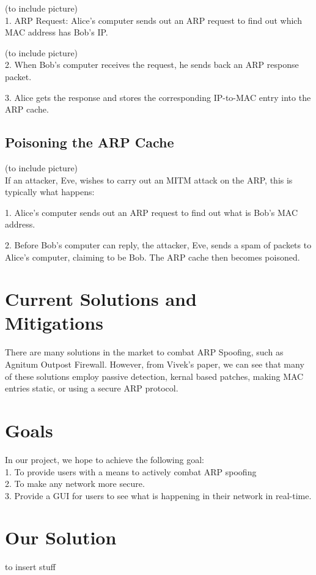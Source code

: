 \documentclass{acm_proc_article-sp}
\begin{document}
(to include picture) \\
1. ARP Request: Alice's computer sends out an ARP request to find out which MAC address has Bob's IP. 

(to include picture) \\
2. When Bob's computer receives the request, he sends back an ARP response packet. 

3. Alice gets the response and stores the corresponding IP-to-MAC entry into the ARP cache. 


\subsection{Poisoning the ARP Cache}
(to include picture) \\
If an attacker, Eve, wishes to carry out an MITM attack on the ARP, this is typically what happens: 

1. Alice's computer sends out an ARP request to find out what is Bob's MAC address. 

2. Before Bob's computer can reply, the attacker, Eve, sends a spam of packets to Alice's computer, claiming to be Bob. The ARP cache then becomes poisoned. 


\section{Current Solutions and \\Mitigations}
There are many solutions in the market to combat ARP Spoofing, such as Agnitum Outpost Firewall. However, from Vivek's\cite{vivek:arp} paper, we can see that many of these solutions employ passive detection, kernal based patches, making MAC entries static, or using a secure ARP protocol. 

\section{Goals}
In our project, we hope to achieve the following goal: \\
1. To provide users with a means to actively combat ARP spoofing \\
2. To make any network more secure. \\
3. Provide a GUI for users to see what is happening in their network in real-time. 

\section{Our Solution}
to insert stuff
\end{document}
